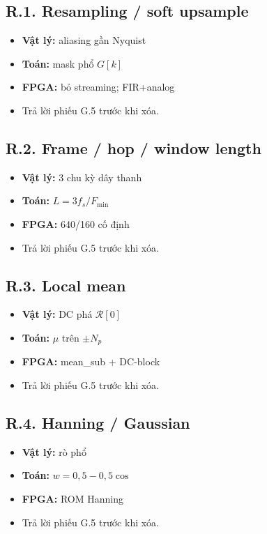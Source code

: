 \subsection*{R.1. Resampling / soft upsample}
\begin{itemize}\setlength{\itemsep}{2pt}
\item \textbf{Vật lý:} aliasing gần Nyquist
\item \textbf{Toán:} mask phổ $G[k]$
\item \textbf{FPGA:} bỏ streaming; FIR+analog
\item Trả lời phiếu G.5 trước khi xóa.
\end{itemize}
\subsection*{R.2. Frame / hop / window length}
\begin{itemize}\setlength{\itemsep}{2pt}
\item \textbf{Vật lý:} 3 chu kỳ dây thanh
\item \textbf{Toán:} $L=3f_s/F_{\min}$
\item \textbf{FPGA:} 640/160 cố định
\item Trả lời phiếu G.5 trước khi xóa.
\end{itemize}
\subsection*{R.3. Local mean}
\begin{itemize}\setlength{\itemsep}{2pt}
\item \textbf{Vật lý:} DC phá $\mathcal{R}[0]$
\item \textbf{Toán:} $\mu$ trên $\pm N_p$
\item \textbf{FPGA:} mean\_sub + DC-block
\item Trả lời phiếu G.5 trước khi xóa.
\end{itemize}
\subsection*{R.4. Hanning / Gaussian}
\begin{itemize}\setlength{\itemsep}{2pt}
\item \textbf{Vật lý:} rò phổ
\item \textbf{Toán:} $w=0{,}5-0{,}5\cos$
\item \textbf{FPGA:} ROM Hanning
\item Trả lời phiếu G.5 trước khi xóa.
\end{itemize}
